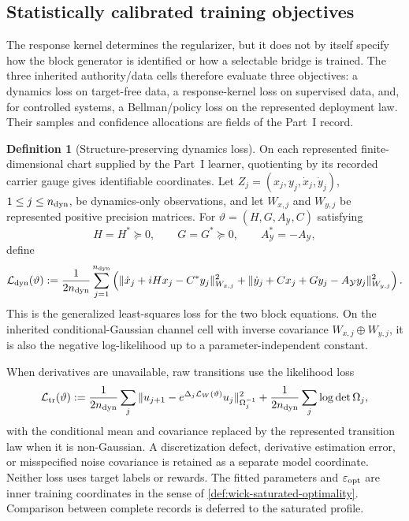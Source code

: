 \documentclass[11pt]{article}
\numberwithin{section}{part}
\theoremstyle{plain}
\theoremstyle{definition}
\newtheorem{definition}[definition]{Definition}
\theoremstyle{remark}
\begin{document}
\subsection{Statistically calibrated training objectives}
\label{subsec:wick-training-objectives}

The response kernel determines the regularizer, but it does not by itself
specify how the block generator is identified or how a selectable bridge is
trained.  The three inherited authority/data cells therefore evaluate three
objectives: a dynamics loss on target-free data, a response-kernel loss on
supervised data, and, for controlled systems, a Bellman/policy loss on the
represented deployment law.  Their samples and confidence allocations are
fields of the Part~I record.

\begin{definition}[Structure-preserving dynamics loss]
\label{def:wick-dynamics-training-loss}
On each represented finite-dimensional chart supplied by the Part~I learner,
quotienting by its recorded carrier gauge gives identifiable coordinates. Let
\(Z_j=(x_j,y_j,\dot x_j,\dot y_j)\), \(1\le j\le n_{\rm dyn}\),
be dynamics-only observations, and let
\(W_{x,j}\) and \(W_{y,j}\) be represented positive precision matrices.
For
\(\vartheta=(H,G,A_{\mathcal Y},C)\) satisfying
\[
 H=H^*\succeq0,\qquad G=G^*\succeq0,\qquad
 A_{\mathcal Y}^*=-A_{\mathcal Y},
\]
define
\begin{equation}
 \label{eq:wick-dynamics-training-loss}
 \mathcal L_{\rm dyn}(\vartheta)
 :=\frac1{2n_{\rm dyn}}\sum_{j=1}^{n_{\rm dyn}}
 \left(
 \|\dot x_j+iHx_j-C^*y_j\|_{W_{x,j}}^2
 +\|\dot y_j+Cx_j+Gy_j-A_{\mathcal Y}y_j\|_{W_{y,j}}^2
 \right).
\end{equation}
This is the generalized least-squares loss for the two block equations.  On
the inherited conditional-Gaussian channel cell with inverse covariance
\(W_{x,j}\oplus W_{y,j}\), it is also the negative log-likelihood up to a
parameter-independent constant.

When derivatives are unavailable, raw transitions use the likelihood loss
\begin{equation}
 \label{eq:wick-transition-training-loss}
 \mathcal L_{\rm tr}(\vartheta)
 :=\frac1{2n_{\rm dyn}}\sum_j
 \|u_{j+1}-e^{\Delta_j\mathcal L_W(\vartheta)}u_j\|_{\Omega_j^{-1}}^2
 +\frac1{2n_{\rm dyn}}\sum_j\log\det\Omega_j,
\end{equation}
with the conditional mean and covariance replaced by the represented
transition law when it is non-Gaussian.  A discretization defect, derivative
estimation error, or misspecified noise covariance is retained as a separate
model coordinate.  Neither loss uses target labels or rewards.
The fitted parameters and \(\varepsilon_{\rm opt}\) are inner training
coordinates in the sense of \cref{def:wick-saturated-optimality}.  Comparison
between complete records is deferred to the saturated profile.
\end{definition}
\end{document}
